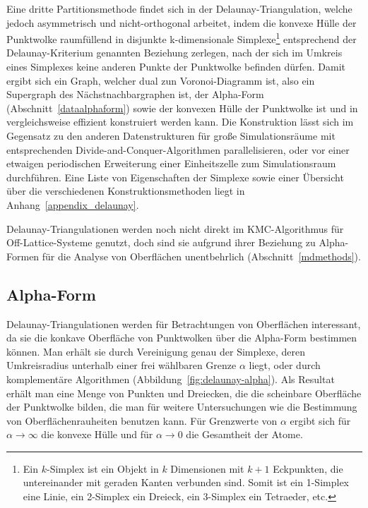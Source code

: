 Eine dritte Partitionsmethode findet sich in der Delaunay-Triangulation, welche jedoch asymmetrisch und nicht-orthogonal arbeitet, indem die konvexe Hülle der Punktwolke raumfüllend in disjunkte k-dimensionale Simplexe\footnote{Ein $k$-Simplex ist ein Objekt in $k$ Dimensionen mit $k+1$ Eckpunkten, die untereinander mit geraden Kanten verbunden sind. Somit ist ein 1-Simplex eine Linie, ein 2-Simplex ein Dreieck, ein 3-Simplex ein Tetraeder, etc.} entsprechend der Delaunay-Kriterium genannten Beziehung zerlegen, nach der sich im Umkreis eines Simplexes keine anderen Punkte der Punktwolke befinden dürfen.
Damit ergibt sich ein Graph, welcher dual zun Voronoi-Diagramm ist, also ein Supergraph des Nächstnachbargraphen ist, der Alpha-Form (Abschnitt~\ref{dataalphaform}) sowie der konvexen Hülle der Punktwolke ist und in  vergleichsweise effizient konstruiert werden kann.
Die Konstruktion lässt sich im Gegensatz zu den anderen Datenstrukturen für große Simulationsräume mit entsprechenden Divide-and-Conquer-Algorithmen parallelisieren, oder vor einer etwaigen periodischen Erweiterung einer Einheitszelle zum Simulationsraum durchführen.
Eine Liste von Eigenschaften der Simplexe sowie einer Übersicht über die verschiedenen Konstruktionsmethoden liegt in Anhang~\ref{appendix_delaunay}.

Delaunay-Triangulationen werden noch nicht direkt im KMC-Algorithmus für Off-Lattice-Systeme genutzt, doch sind sie aufgrund ihrer Beziehung zu Alpha-Formen für die Analyse von Oberflächen unentbehrlich (Abschnitt~\ref{mdmethods}).

\subsection{Alpha-Form}

Delaunay-Triangulationen werden für Betrachtungen von Oberflächen interessant, da sie die konkave Oberfläche von Punktwolken über die Alpha-Form bestimmen können.
Man erhält sie durch Vereinigung genau der Simplexe, deren Umkreisradius unterhalb einer frei wählbaren Grenze $\alpha$ liegt, oder durch komplementäre Algorithmen (Abbildung~\ref{fig:delaunay-alpha}).
Als Resultat erhält man eine Menge von Punkten und Dreiecken, die die scheinbare Oberfläche der Punktwolke bilden, die man für weitere Untersuchungen wie die Bestimmung von Oberflächenrauheiten benutzen kann.
Für Grenzwerte von $\alpha$ ergibt sich für $\alpha \rightarrow \infty$ die konvexe Hülle und für $\alpha \rightarrow 0$ die Gesamtheit der Atome.

